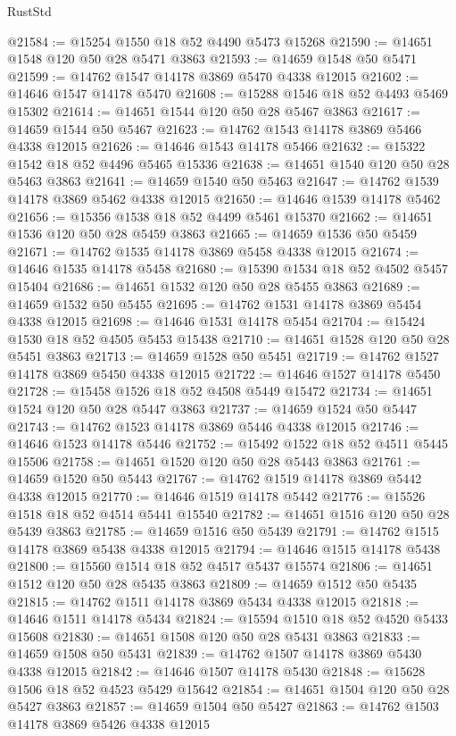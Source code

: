 \begin{lexlean}{RustStd}
\begin{coremodule}
@21584 := @15254 @1550 @18 @52 @4490 @5473 @15268
@21590 := @14651 @1548 @120 @50 @28 @5471 @3863
@21593 := @14659 @1548 @50 @5471
@21599 := @14762 @1547 @14178 @3869 @5470 @4338 @12015
@21602 := @14646 @1547 @14178 @5470
@21608 := @15288 @1546 @18 @52 @4493 @5469 @15302
@21614 := @14651 @1544 @120 @50 @28 @5467 @3863
@21617 := @14659 @1544 @50 @5467
@21623 := @14762 @1543 @14178 @3869 @5466 @4338 @12015
@21626 := @14646 @1543 @14178 @5466
@21632 := @15322 @1542 @18 @52 @4496 @5465 @15336
@21638 := @14651 @1540 @120 @50 @28 @5463 @3863
@21641 := @14659 @1540 @50 @5463
@21647 := @14762 @1539 @14178 @3869 @5462 @4338 @12015
@21650 := @14646 @1539 @14178 @5462
@21656 := @15356 @1538 @18 @52 @4499 @5461 @15370
@21662 := @14651 @1536 @120 @50 @28 @5459 @3863
@21665 := @14659 @1536 @50 @5459
@21671 := @14762 @1535 @14178 @3869 @5458 @4338 @12015
@21674 := @14646 @1535 @14178 @5458
@21680 := @15390 @1534 @18 @52 @4502 @5457 @15404
@21686 := @14651 @1532 @120 @50 @28 @5455 @3863
@21689 := @14659 @1532 @50 @5455
@21695 := @14762 @1531 @14178 @3869 @5454 @4338 @12015
@21698 := @14646 @1531 @14178 @5454
@21704 := @15424 @1530 @18 @52 @4505 @5453 @15438
@21710 := @14651 @1528 @120 @50 @28 @5451 @3863
@21713 := @14659 @1528 @50 @5451
@21719 := @14762 @1527 @14178 @3869 @5450 @4338 @12015
@21722 := @14646 @1527 @14178 @5450
@21728 := @15458 @1526 @18 @52 @4508 @5449 @15472
@21734 := @14651 @1524 @120 @50 @28 @5447 @3863
@21737 := @14659 @1524 @50 @5447
@21743 := @14762 @1523 @14178 @3869 @5446 @4338 @12015
@21746 := @14646 @1523 @14178 @5446
@21752 := @15492 @1522 @18 @52 @4511 @5445 @15506
@21758 := @14651 @1520 @120 @50 @28 @5443 @3863
@21761 := @14659 @1520 @50 @5443
@21767 := @14762 @1519 @14178 @3869 @5442 @4338 @12015
@21770 := @14646 @1519 @14178 @5442
@21776 := @15526 @1518 @18 @52 @4514 @5441 @15540
@21782 := @14651 @1516 @120 @50 @28 @5439 @3863
@21785 := @14659 @1516 @50 @5439
@21791 := @14762 @1515 @14178 @3869 @5438 @4338 @12015
@21794 := @14646 @1515 @14178 @5438
@21800 := @15560 @1514 @18 @52 @4517 @5437 @15574
@21806 := @14651 @1512 @120 @50 @28 @5435 @3863
@21809 := @14659 @1512 @50 @5435
@21815 := @14762 @1511 @14178 @3869 @5434 @4338 @12015
@21818 := @14646 @1511 @14178 @5434
@21824 := @15594 @1510 @18 @52 @4520 @5433 @15608
@21830 := @14651 @1508 @120 @50 @28 @5431 @3863
@21833 := @14659 @1508 @50 @5431
@21839 := @14762 @1507 @14178 @3869 @5430 @4338 @12015
@21842 := @14646 @1507 @14178 @5430
@21848 := @15628 @1506 @18 @52 @4523 @5429 @15642
@21854 := @14651 @1504 @120 @50 @28 @5427 @3863
@21857 := @14659 @1504 @50 @5427
@21863 := @14762 @1503 @14178 @3869 @5426 @4338 @12015

\end{coremodule}
\end{lexlean}
